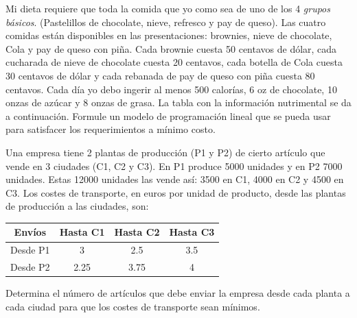 \begin{Ejer}
Mi dieta requiere que toda la comida que yo como sea de uno de los 4 \textit{grupos b\'asicos}. (Pastelillos de chocolate, nieve, refresco y pay de queso). Las cuatro comidas est\'an disponibles en las presentaciones: brownies, nieve de chocolate, Cola y pay de queso con pi\~na. Cada brownie cuesta 50 centavos de d\'olar, cada cucharada de nieve de chocolate cuesta 20 centavos, cada botella de Cola cuesta 30 centavos de d\'olar y cada rebanada de pay de queso con pi\~na cuesta 80 centavos. Cada d\'ia yo debo ingerir al menos 500 calor\'ias, 6 oz de chocolate, 10 onzas de az\'ucar y 8 onzas de grasa. La tabla con la informaci\'on nutrimental se da a continuaci\'on. Formule un modelo de programaci\'on lineal que se pueda usar para satisfacer los requerimientos a m\'inimo costo.

\begin{center}
\end{center}
\end{Ejer}

\begin{Ejer}

\end{Ejer}



\begin{Ejer}
Una empresa tiene 2 plantas de producci\'on (P1 y P2) de cierto art\'iculo que vende en 3 ciudades (C1, C2 y C3). En P1 produce 5000 unidades y en P2 7000 unidades. Estas 12000 unidades las vende as\'i: 3500 en C1, 4000 en C2 y 4500 en C3. Los costes de transporte, en euros por unidad de producto, desde las plantas de producci\'on a las ciudades, son:

\begin{center}
\begin{tabular}{c|ccc}
Env\'ios & Hasta C1 & Hasta C2 & Hasta C3 \\
\hline
Desde P1 & 3 & 2.5 & 3.5 \\
Desde P2 & 2.25 & 3.75 & 4 \\
\end{tabular}
\end{center}

Determina el n\'umero de art\'iculos que debe enviar la empresa desde cada planta a cada ciudad para que los costes de transporte sean m\'inimos.
\end{Ejer}


